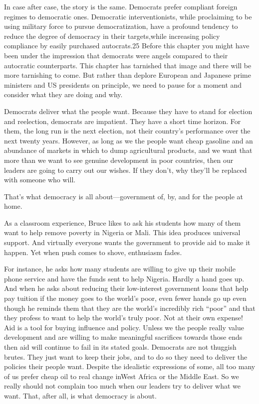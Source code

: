 \documentclass[10pt]{article}
\begin{document}
{\large In case after case, the story is the same. Democrats prefer compliant
foreign regimes to democratic ones. Democratic interventionists, while
proclaiming to be using military force to pursue democratization, have a profound
tendency to reduce the degree of democracy in their targets,while increasing
policy compliance by easily purchased autocrats.25 Before this chapter you might
have been under the impression that democrats were angels compared to their
autocratic counterparts. This chapter has tarnished that image and there will be
more tarnishing to come. But rather than deplore European and Japanese prime
ministers and US presidents on principle, we need to pause for a moment and
consider what they are doing and why.}

{\large Democrats deliver what the people want. Because they have to stand for
election and reelection, democrats are impatient. They have a short time horizon.
For them, the long run is the next election, not their country's performance over
the next twenty years. However, as long as we the people want cheap gasoline and
an abundance of markets in which to dump agricultural products, and we want that
more than we want to see genuine development in poor countries, then our leaders
are going to carry out our wishes. If they don't, why they'll be replaced with
someone who will.}

{\large That's what democracy is all about---government of, by, and for the
people at home.}

{\large As a classroom experience, Bruce likes to ask his students how many of
them want to help remove poverty in Nigeria or Mali. This idea produces universal
support. And virtually everyone wants the government to provide aid to make it
happen. Yet when push comes to shove, enthusiasm fades.}

{\large For instance, he asks how many students are willing to give up their
mobile phone service and have the funds sent to help Nigeria. Hardly a hand goes
up. And when he asks about reducing their low-interest government loans that help
pay tuition if the money goes to the world's poor, even fewer hands go up even
though he reminds them that they are the world's incredibly rich ``poor'' and
that they profess to want to help the world's truly poor. Not at their own
expense! Aid is a tool for buying influence and policy. Unless we the people
really value development and are willing to make meaningful sacrifices towards
those ends then aid will continue to fail in its stated goals. Democrats are not
thuggish brutes. They just want to keep their jobs, and to do so they need to
deliver the policies their people want. Despite the idealistic expressions of
some, all too many of us prefer cheap oil to real change inWest Africa or the
Middle East. So we really should not complain too much when our leaders try to
deliver what we want. That, after all, is what democracy is about.}
\pagebreak{}
\end{document}
